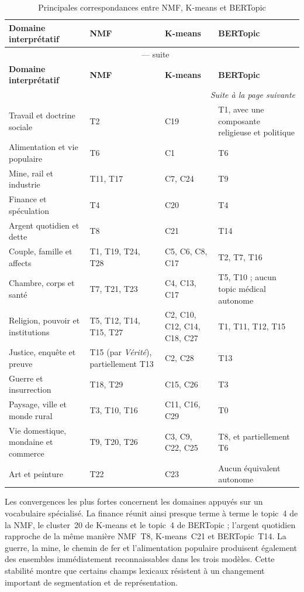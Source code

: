 {\small
\begin{longtable}{
    @{}
    p{}
    >{\centering\arraybackslash}p{}
    >{\centering\arraybackslash}p{}
    >{\centering\arraybackslash}p{}
    @{}
}
\caption{Principales correspondances entre NMF, K-means et BERTopic}
\label{tab:correspondances-nmf-kmeans-bertopic}\\
\toprule
\textbf{Domaine interprétatif} & \textbf{NMF} & \textbf{K-means} & \textbf{BERTopic}\\
\midrule
\endfirsthead
\multicolumn{4}{c}{\tablename\ \thetable{} --- suite}\\
\toprule
\textbf{Domaine interprétatif} & \textbf{NMF} & \textbf{K-means} & \textbf{BERTopic}\\
\midrule
\endhead
\midrule
\multicolumn{4}{r}{\textit{Suite à la page suivante}}\\
\endfoot
\bottomrule
\endlastfoot
Travail et doctrine sociale & T2 & C19 & T1, avec une composante religieuse et politique\\
Alimentation et vie populaire & T6 & C1 & T6\\
Mine, rail et industrie & T11, T17 & C7, C24 & T9\\
Finance et spéculation & T4 & C20 & T4\\
Argent quotidien et dette & T8 & C21 & T14\\
Couple, famille et affects & T1, T19, T24, T28 & C5, C6, C8, C17 & T2, T7, T16\\
Chambre, corps et santé & T7, T21, T23 & C4, C13, C17 & T5, T10 ; aucun topic médical autonome\\
Religion, pouvoir et institutions & T5, T12, T14, T15, T27 & C2, C10, C12, C14, C18, C27 & T1, T11, T12, T15\\
Justice, enquête et preuve & T15 (par \textit{Vérité}), partiellement T13 & C2, C28 & T13\\
Guerre et insurrection & T18, T29 & C15, C26 & T3\\
Paysage, ville et monde rural & T3, T10, T16 & C11, C16, C29 & T0\\
Vie domestique, mondaine et commerce & T9, T20, T26 & C3, C9, C22, C25 & T8, et partiellement T6\\
Art et peinture & T22 & C23 & Aucun équivalent autonome\\
\end{longtable}
}

Les convergences les plus fortes concernent les domaines appuyés sur un vocabulaire spécialisé. La finance réunit ainsi presque terme à terme le topic~4 de la NMF, le cluster~20 de K-means et le topic~4 de BERTopic ; l'argent quotidien rapproche de la même manière NMF~T8, K-means~C21 et BERTopic~T14. La guerre, la mine, le chemin de fer et l'alimentation populaire produisent également des ensembles immédiatement reconnaissables dans les trois modèles. Cette stabilité montre que certains champs lexicaux résistent à un changement important de segmentation et de représentation.

